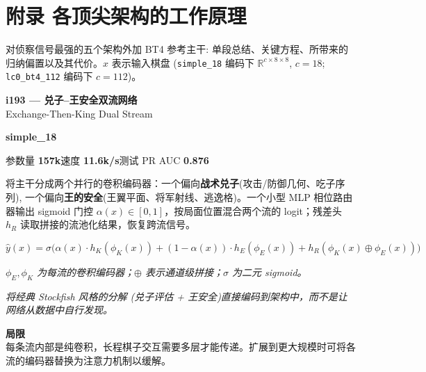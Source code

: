 \documentclass[10pt,a4paper]{article}
\newcommand{\pillsi}[0]{\colorbox{s18redbg}{\strut\textcolor{s18red}{\scriptsize\bfseries\sffamily simple\_18}}}
\begin{document}
\clearpage
\section{附录 \textperiodcentered{} 各顶尖架构的工作原理}

对侦察信号最强的五个架构外加 BT4 参考主干: 单段总结、关键方程、所带来的归纳偏置以及其代价。$x$ 表示输入棋盘 (\texttt{simple\_18} 编码下 $\mathbb{R}^{c \times 8 \times 8}$, $c=18$; \texttt{lc0\_bt4\_112} 编码下 $c=112$)。

\medskip

\begin{tcolorbox}
\begin{tcolorbox}[archhead, boxsep=0pt, top=4pt, bottom=4pt]
\textcolor{deepforest}{\sffamily\bfseries\large i193 --- 兑子–王安全双流网络} \\[2pt]
{\color{muted}\small Exchange-Then-King Dual Stream}
\\[1pt]\textcolor{muted}{\sffamily\scriptsize \pillsi{}\quad 参数量 \textbf{157k}\quad 速度 \textbf{11.6k/s}\quad 测试 PR AUC \textbf{0.876}}
\end{tcolorbox}
\smallskip
将主干分成两个并行的卷积编码器：一个偏向\textbf{战术兑子}(攻击/防御几何、吃子序列), 一个偏向\textbf{王的安全}(王翼平面、将军射线、逃逸格)。一个小型 MLP 相位路由器输出 sigmoid 门控 $\alpha(x)\in[0,1]$，按局面位置混合两个流的 logit；残差头 $h_R$ 读取拼接的流池化结果，恢复跨流信号。
\par\smallskip
\begin{equation*}
\hat{y}(x) = \sigma\!\bigl( \alpha(x)\cdot h_K(\phi_K(x)) + (1-\alpha(x))\cdot h_E(\phi_E(x)) + h_R(\phi_K(x)\oplus\phi_E(x)) \bigr)
\end{equation*}
\par\vspace{-4pt}\begin{center}\textit{\textcolor{muted}{\small $\phi_E,\phi_K$ 为每流的卷积编码器；$\oplus$ 表示通道级拼接；$\sigma$ 为二元 sigmoid。}}\end{center}
\par\smallskip{\color{forest}\sffamily\bfseries\textgreater\,}\textit{将经典 Stockfish 风格的分解 (\textit{兑子评估} + \textit{王安全})直接编码到架构中，而不是让网络从数据中自行发现。}
\par\smallskip\textbf{\sffamily\footnotesize\color{muted}局限}\\
每条流内部是纯卷积，长程棋子交互需要多层才能传递。扩展到更大规模时可将各流的编码器替换为注意力机制以缓解。
\end{tcolorbox}
\end{document}
